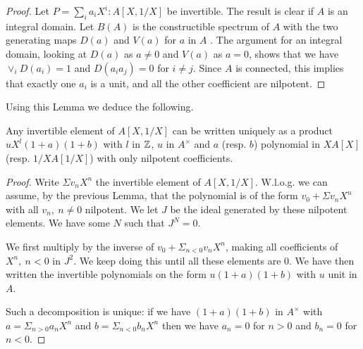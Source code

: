  \begin{proof}
   Let $P = \sum_i a_iX^i:A[X,1/X]$ be invertible.
   The result is clear if $A$ is an integral domain. Let $B(A)$ is the constructible spectrum of $A$
   with the two generating maps $D(a)$ and $V(a)$ for $a$ in $A$ \cite{lombardi-quitte}. The argument for an integral
   domain, looking at $D(a)$ as $a\neq 0$ and $V(a)$ as $a =0$, shows that we have $\vee_i D(a_i) = 1$
   and $D(a_ia_j) = 0$ for $i\neq j$. Since $A$ is connected, this implies that exactly one $a_i$ is a unit,
   and all the other coefficient are nilpotent.
 \end{proof}
 
 Using this Lemma we deduce the following.

\begin{lemma}\label{nilpotent}
  Any invertible element of $A[X,1/X]$ can be written uniquely as a product
  $uX^l(1+a)(1+b)$ with $l$ in $\mathbb{Z}$, $u$ in $A^{\times}$ and $a$ (resp. $b$)
  polynomial in $XA[X]$ (resp. $1/XA[1/X]$) with only nilpotent coefficients.
\end{lemma}

\begin{proof}
  Write $\Sigma v_nX^n$ the invertible element of $A[X,1/X]$.
  W.l.o.g. we can assume, by the previous Lemma, that the polynomial is of the form $v_0 + \Sigma v_nX^n$ with
  all $v_n,~n\neq 0$ nilpotent.
  We let $J$ be the ideal generated by these nilpotent elements.
  We have some $N$ such that $J^N = 0$.
  
  We first multiply by the inverse of $v_0 + \Sigma_{n<0}v_nX^n$, making all coefficients of
  $X^n,~n<0$ in $J^2$.
  We keep doing this until all these elements are $0$.
  We have then written the invertible polynomials on the form $u(1+a)(1+b)$ with $u$ unit in $A$.

  Such a decomposition is unique: if we have $(1+a)(1+b)$ in $A^{\times}$ with $a = \Sigma_{n> 0}a_nX^n$
  and $b = \Sigma_{n<0}b_nX^n$ then we have $a_n = 0$ for $n>0$ and $b_n = 0$ for $n<0$.
\end{proof}

